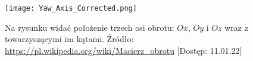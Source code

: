 \begin{figure}[H]
    \centering
    \texttt{[image: Yaw\_Axis\_Corrected.png]}
    \centering
    \caption{Na rysunku widać położenie trzech osi obrotu: $Ox$, $Oy$ i $Oz$ wraz z towarzyszącymi im kątami. Źródło: \url{https://pl.wikipedia.org/wiki/Macierz_obrotu} [Dostęp: 11.01.22]}
\end{figure}



